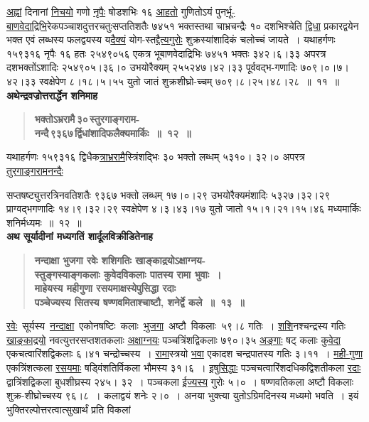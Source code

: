 \documentclass[11pt, openany]{book}
\begin{document}
\hyperref[1.11]{अह्नां} दिनानां \hyperref[1.11]{निचयो} गणो \hyperref[1.11]{नृपैः} षोडशभिः १६ \hyperref[1.11]{आहतो} गुणितोऽयं पुन\hyperref[1.11]{र्भू-बाणवेदाद्रिभि}रेकपञ्चाशदुत्तरचतुःसप्ततिशतैः ७४५१ भक्तस्तथा चाभ्रचन्द्रैः १० दशभिश्चेति \hyperref[1.11]{द्विधा} प्रकारद्वयेन भक्त एवं लब्धस्य फलद्वयस्य य\hyperref[1.11]{दैक्यं} योग-स्त\hyperref[1.11]{द्दैत्यगुरोः} शुक्रस्यांशादिकं चलोच्चं जायते~। यथाहर्गणः १५९३१६ नृपैः १६ हतः २५४९०५६ एकत्र भूबाणवेदाद्रिभिः ७४५१ भक्तः ३४२।६।३३ अपरत्र दशभक्तोंऽशादिः २५४९०५।३६।० उभयोरैक्यम् २५५२४७।४२।३३ पूर्ववद्भ-गणादिः ७०९।०।७।४२।३३ स्वक्षेपेण ८।१८।५।५५ युतो जातं शुक्रशीघ्रो-च्चम् ७०९।८।२५।४८।२८~॥~११~॥\\

{\small \textbf{अथेन्द्रवज्रोत्तरार्द्धेन शनिमाह\textendash }}

 \label{1.12}
\begin{quote}
{\large \textbf{{\color{purple}भक्तोऽभ्ररामै\textendash \,३०\textendash \,स्तुरगाङ्गराम-\\
नन्दै\textendash \,९३६७\textendash \,र्द्विधांशादिफलैक्यमार्किः~॥~१२~॥}}}
\end{quote}

यथाहर्गणः १५९३१६ द्विधैक\hyperref[1.12]{त्राभ्ररामै}स्त्रिंशद्भिः ३० भक्तो लब्धम् ५३१०। ३२।० अपरत्र \hyperref[1.12]{तुरगाङ्गरामनन्दैः}

\newpage

\noindent सप्तषष्ट्युत्तरत्रिनवतिशतैः ९३६७ भक्तो लब्धम् १७।०।२९ उभयोरैक्यमंशादिः ५३२७।३२।२९ प्राग्वद्भगणादिः १४।९।३२।२९ स्वक्षेपेण ४।३।४३।१७ युतो जातो १५।१।२१।१५।४६ मध्यमार्किः शनिर्मध्यमः~॥~१२~॥\\

{\small \textbf{अथ सूर्यादीनां मध्यगतिं शार्दूलविक्रीडितेनाह\textendash }}

 \label{1.13}
\begin{quote}
{\large \textbf{{\color{purple}नन्दाक्षा भुजगा रवेः शशिगतिः खाङ्काद्रयोऽक्षाग्नय-\\
स्तुङ्गस्याङ्गकलाः कुवेदविकलाः पातस्य रामा भुवाः~। \\
माहेयस्य महीगुणा रसयमाक्षस्येपुसिद्धा रदाः \\
पञ्चेज्यस्य सितस्य षण्णवमिताश्चाष्टौ, शनेर्द्वे कले~॥~१३~॥}}}
\end{quote}

\hyperref[1.13]{रवेः} \,सूर्यस्य \,\hyperref[1.13]{नन्दाक्षा} \,एकोनषष्टिः \,कलाः \,\hyperref[1.13]{भुजगा} \,अष्टौ \,विकलाः \,५९।८ गतिः~। \hyperref[1.13]{शशि}नश्चन्द्रस्य गतिः \hyperref[1.13]{खाङ्काद्रयो} नवत्युत्तरसप्तशतकलाः \hyperref[1.13]{अक्षाग्नयः} पञ्चत्रिंशद्विकलाः ७९०।३५ \hyperref[1.13]{अङ्गाः} षट् कलाः \hyperref[1.13]{कुवेदा} एकचत्वारिंशद्विकलाः ६।४१ चन्द्रोच्चस्य~। \hyperref[1.13]{रामा}स्त्रयो \hyperref[1.13]{भवा} एकादश चन्द्रपातस्य गतिः ३।११~। \hyperref[1.13]{मही-गुणा} एकत्रिंशत्कला \hyperref[1.13]{रसयमाः} षड्विंशतिर्विकला भौमस्य ३१।६~। \hyperref[1.13]{इषुसिद्धाः} पञ्चचत्वारिंशदधिकद्विशतीकला \hyperref[1.13]{रदाः} द्वात्रिंशद्विकला बुधशीघ्रस्य २४५। ३२~। \;पञ्चकला \;\hyperref[1.13]{ईज्यस्य} \;गुरोः \;५।०~। \;षण्णवतिकला \;अष्टौ \;विकलाः \;शुक्र-शीघ्रोच्चस्य ९६।८~। कलाद्वयं शनेः २।०~। अनया भुक्त्या युतोऽग्रिमदिनस्य मध्यमो भवति~। इयं भुक्तिरल्पोत्तरत्वात्सुखार्थं प्रति विकलां
\end{document}
